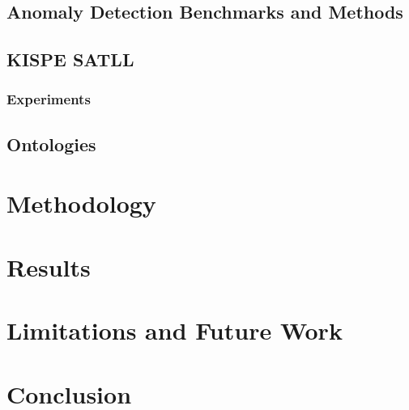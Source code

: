\documentclass[conference]{IEEEtran}
\begin{document}
\subsection{Anomaly Detection Benchmarks and Methods}

\subsection{KISPE SATLL}

\subsubsection{Experiments}

\subsection{Ontologies}

\section{Methodology}

\section{Results}

\section{Limitations and Future Work}

\section{Conclusion}
\end{document}
